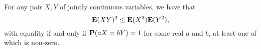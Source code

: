 \begin{theorem} For any pair $X, Y$ of jointly continuous variables, we have that 
\begin{equation*}
    \mathbf{E}(XY)^2 \leq \mathbf{E}(X^2) \mathbf{E}(Y^2), 
\end{equation*}
with equality if and only if $\mathbf{P}(aX = bY) = 1$ for some real $a$ and $b$, at least one of which is non-zero. 
\end{theorem}


